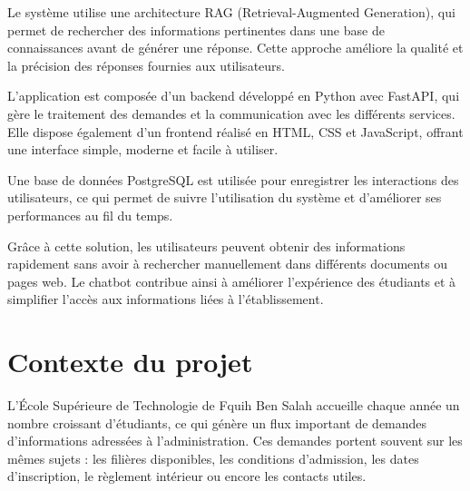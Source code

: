 \documentclass[12pt, a4paper, twoside]{report}
\begin{document}
Le système utilise une architecture RAG (Retrieval-Augmented Generation), qui \newline permet de rechercher des informations pertinentes dans une base de connaissances avant de générer une réponse. Cette approche améliore la qualité et la précision des réponses fournies aux utilisateurs.\newline

L’application est composée d’un backend développé en Python avec FastAPI, qui gère le traitement des demandes et la communication avec les différents services. Elle dispose également d’un frontend réalisé en HTML, CSS et JavaScript, offrant une interface simple, moderne et facile à utiliser.\newline

Une base de données PostgreSQL est utilisée pour enregistrer les interactions des \newline utilisateurs, ce qui permet de suivre l’utilisation du système et d’améliorer ses \newline performances au fil du temps.\newline

Grâce à cette solution, les utilisateurs peuvent obtenir des informations rapidement sans avoir à rechercher manuellement dans différents documents ou pages web. Le chatbot contribue ainsi à améliorer l’expérience des étudiants et à simplifier l’accès aux \newline informations liées à l’établissement.
\newline
\newline
\begin{center}
\end{center}
\newpage
\section{Contexte du projet}
L'École Supérieure de Technologie de Fquih Ben Salah accueille chaque année un nombre croissant d'étudiants, ce qui génère un flux important de demandes \newline d'informations adressées à l'administration. Ces demandes portent souvent sur les mêmes sujets : les filières disponibles, les conditions d'admission, les dates d'inscription, le \newline règlement intérieur ou encore les contacts utiles.
\newline
\end{document}
